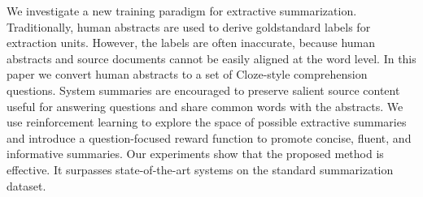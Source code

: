 We investigate a new training paradigm for extractive summarization. Traditionally, human abstracts are used to derive goldstandard labels for extraction units. However, the labels are often inaccurate, because human abstracts and source documents cannot be easily aligned at the word level. In this paper we convert human abstracts to a set of Cloze-style comprehension questions. System summaries are encouraged to preserve salient source content useful for answering questions and share common words with the abstracts. We use reinforcement learning to explore the space of possible extractive summaries and introduce a question-focused reward function to promote concise, fluent, and informative summaries. Our experiments show that the proposed method is effective. It surpasses state-of-the-art systems on the standard summarization dataset.
